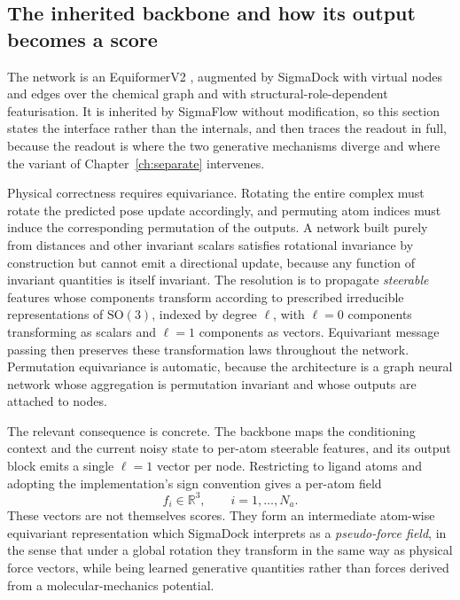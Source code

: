 \documentclass[11pt,a4paper]{report}
\theoremstyle{plain}
\theoremstyle{definition}
\theoremstyle{remark}
\newcommand{\R}{\mathbb{R}}
\newcommand{\SOthree}{\mathrm{SO}(3)}
\begin{document}
\subsection{The inherited backbone and how its output becomes a score}
\label{sec:backbone}

The network is an EquiformerV2 \citep{liao2024equiformerv2}, augmented by
SigmaDock with virtual nodes and edges over the chemical graph and with
structural-role-dependent featurisation. It is inherited by SigmaFlow without
modification, so this section states the interface rather than the internals,
and then traces the readout in full, because the readout is where the two
generative mechanisms diverge and where the variant of
Chapter~\ref{ch:separate} intervenes.

Physical correctness requires equivariance. Rotating the entire complex must
rotate the predicted pose update accordingly, and permuting atom indices must
induce the corresponding permutation of the outputs. A network built purely
from distances and other invariant scalars satisfies rotational invariance by
construction but cannot emit a directional update, because any function of
invariant quantities is itself invariant. The resolution is to propagate
\emph{steerable} features whose components transform according to prescribed
irreducible representations of $\SOthree$, indexed by degree $\ell$, with
$\ell=0$ components transforming as scalars and $\ell=1$ components as
vectors. Equivariant message passing then preserves these transformation laws
throughout the network. Permutation equivariance is automatic, because the
architecture is a graph neural network whose aggregation is permutation
invariant and whose outputs are attached to nodes.

The relevant consequence is concrete. The backbone maps the conditioning
context and the current noisy state to per-atom steerable features, and its
output block emits a single $\ell=1$ vector per node. Restricting to ligand
atoms and adopting the implementation's sign convention gives a per-atom field
\begin{equation}
  f_i \in \R^3, \qquad i = 1,\ldots,N_a .
  \label{eq:force-field}
\end{equation}
These vectors are not themselves scores. They form an intermediate atom-wise
equivariant representation which SigmaDock interprets as a \emph{pseudo-force
field}, in the sense that under a global rotation they transform in the same
way as physical force vectors, while being learned generative quantities
rather than forces derived from a molecular-mechanics potential.
\end{document}
